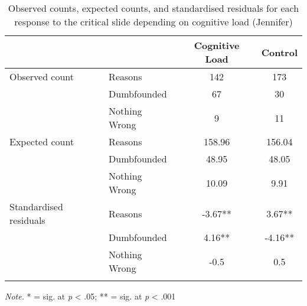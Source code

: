 \documentclass[
  american,
  man,floatsintext]{apa7}
\begin{document}
\begin{table}[tbp]

\begin{center}
\begin{threeparttable}

\caption{\label{tab:tabS6tab1dumbJennifer}Observed counts, expected counts, and standardised residuals for each response to the critical slide depending on cognitive load (Jennifer)}

\begin{tabular}{llcc}
\toprule
 & \multicolumn{1}{c}{} & \multicolumn{1}{c}{Cognitive Load} & \multicolumn{1}{c}{Control}\\
\midrule
Observed count & Reasons & 142 & 173\\
 & Dumbfounded & 67 & 30\\
 & Nothing Wrong & 9 & 11\\
Expected count & Reasons & 158.96 & 156.04\\
 & Dumbfounded & 48.95 & 48.05\\
 & Nothing Wrong & 10.09 & 9.91\\
Standardised residuals & Reasons & -3.67** & 3.67**\\
 & Dumbfounded & 4.16** & -4.16**\\
 & Nothing Wrong & -0.5 & 0.5\\
\bottomrule
\addlinespace
\end{tabular}

\begin{tablenotes}[para]
\normalsize{\textit{Note.} * = sig. at \emph{p} < .05; ** = sig. at \emph{p} < .001}
\end{tablenotes}

\end{threeparttable}
\end{center}

\end{table}
\end{document}

